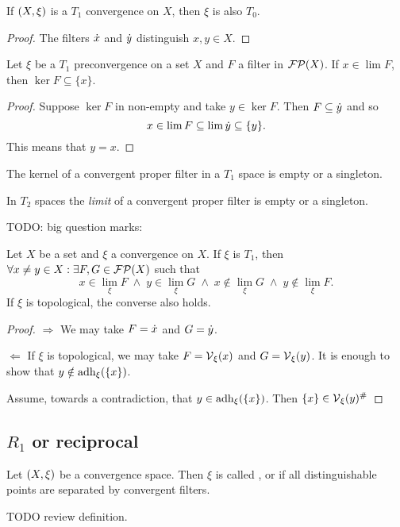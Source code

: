 \begin{lemma}
If $\left( X,\xi \right)$ is a $T_1$ convergence on $X$, then $\xi$ is also $T_0$.
\end{lemma}
\begin{proof}
The filters $\dot{x}$ and $\dot{y}$ distinguish $x,y\in X$.
\end{proof}

\begin{proposition}
Let $\xi$ be a $T_1$ preconvergence on a set $X$ and $F$ a filter in $\operatorname{\mathcal{FP}}(X)$. If $x\in \lim F$, then $\ker F \subseteq \{x\}$.
\end{proposition}
\begin{proof}
Suppose $\ker F$ in non-empty and take $y \in \ker F$. Then $F \subseteq \dot{y}$ and so
\[ x \in \lim F \subseteq \lim \dot{y} \subseteq \{y\}. \]
This means that $y = x$.
\end{proof}
\begin{corollary}
The kernel of a convergent proper filter in a $T_1$ space is empty or a singleton.
\end{corollary}
In $T_2$ spaces the \emph{limit} of a convergent proper filter is empty or a singleton.


TODO: big question marks:
\begin{proposition}
Let $X$ be a set and $\xi$ a convergence on $X$. If $\xi$ is $T_1$, then $\forall x\neq y\in X: \exists F,G\in \operatorname{\mathcal{FP}}(X)$ such that
\[ x\in \lim_\xi F \;\land\; y\in \lim_\xi G \;\land\; x\notin \lim_\xi G \;\land\; y\notin \lim_\xi F. \]
If $\xi$ is topological, the converse also holds.
\end{proposition}
\begin{proof}
$\Rightarrow$ We may take $F = \dot{x}$ and $G = \dot{y}$.

$\Leftarrow$ If $\xi$ is topological, we may take $F = \operatorname{\mathcal{V}}_\xi(x)$ and $G = \operatorname{\mathcal{V}}_\xi(y)$. It is enough to show that $y\notin \operatorname{adh}_\xi(\{x\})$.

Assume, towards a contradiction, that $y\in \operatorname{adh}_\xi(\{x\})$. Then $\{x\} \in \operatorname{\mathcal{V}}_\xi(y)^{\mathrel{\#}}$
\end{proof}

\subsection{$R_1$ or reciprocal}
\begin{definition}
Let $\left( X,\xi \right)$ be a convergence space. Then $\xi$ is called ,  or  if all distinguishable points are separated by convergent filters.
\end{definition}
TODO review definition.

